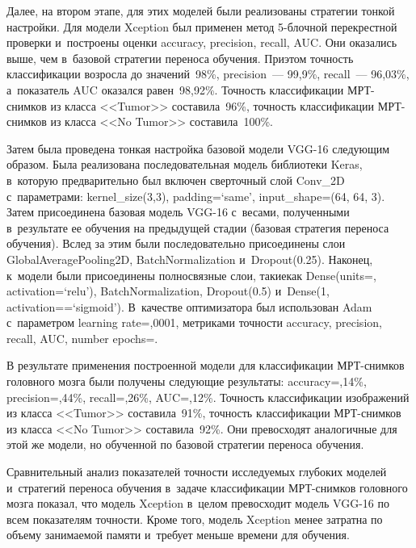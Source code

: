 \begin{multicols}{2}
  
  Далее, на втором этапе, для этих моделей были реализованы стратегии 
тонкой настройки. Для модели Xception был применен метод 5-блоч\-ной 
перекрестной проверки и~построены оценки accuracy, precision, recall, AUC. 
Они оказались выше, чем в~базовой стратегии переноса обучения. При\linebreak этом 
точность классификации возросла до значений~98\%, precision~--- 99,9\%, 
recall~--- 96,03\%, а~показатель AUC оказался равен~98,92\%. Точность 
классификации МРТ-сним\-ков из класса <<Tumor>> \mbox{составила}~96\%, точ\-ность 
классификации МРТ-сним\-ков из класса <<No Tumor>> со\-ста\-ви\-ла~100\%.
  
  Затем была проведена тонкая настройка базовой модели VGG-16 следующим 
образом. Была реализована последовательная модель библиотеки Keras, 
в~которую предварительно был включен сверточный слой Conv\_2D 
с~параметрами: \mbox{kernel\_size(3,3)}, padding\;=\;`same', input\_shape\;=\;(64, 64, 3). 
Затем %
присоединена базовая модель VGG-16 с~весами, полученными 
в~результате ее обучения на предыду\-щей стадии (базовая стратегия переноса 
обучения). Вслед за этим были последовательно присоединены слои 
\mbox{GlobalAveragePooling2D}, BatchNormalization и~Dropout(0.25). Наконец, к~модели 
были присоединены полносвязные слои, такие\linebreak как Dense(units\;=, 
activation\;=\;`relu'), BatchNormalization, Dropout(0.5) и~Dense(1, 
activation\;=\linebreak =\;`sigmoid'). В~качестве оптимизатора был использован Adam 
с~па\-ра\-мет\-ром learning rate\;=,0001, мет\-ри\-ка\-ми точ\-ности accuracy, precision, 
recall, AUC, number epochs\;=. 
  
  В результате применения построенной модели для классификации 
МРТ-снимков головного мозга были получены следующие результаты: 
accuracy\;=,14\%, precision\;=,44\%, recall\;=,26\%, AUC\;=,12\%. 
Точность классификации изображений из класса <<Tumor>> составила~91\%, 
точность классификации МРТ-сним\-ков из класса <<No Tumor>> 
составила~92\%. Они превосходят аналогичные для этой же модели, но 
обученной по базовой стратегии переноса обучения. 
  
  Сравнительный анализ показателей точности исследуемых глубоких моделей 
  и~стратегий переноса обучения в~задаче классификации МРТ-сним\-ков 
головного мозга показал, что модель Xception в~целом превосходит модель 
VGG-16 по всем показателям точности. Кроме того, модель Xception менее 
затратна по объему занимаемой памяти и~требует меньше времени для 
обучения. 


\end{multicols}
